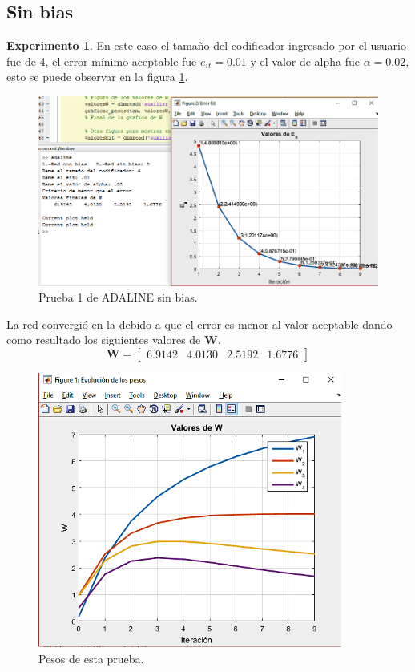 \documentclass[12pt, titlepage]{article}
\begin{document}
    \subsection{Sin bias}
    \textbf{Experimento 1}. En este caso el tamaño del codificador ingresado por el usuario fue de 4, el error mínimo aceptable fue $e_{it} = 0.01$ y el valor de alpha fue $\alpha=0.02$, esto se puede observar en la figura \ref{fig:adaline3error}.
    \begin{figure}[H]
        \begin{center}
            \includegraphics[width=16cm]{img/adaline3/error.png}
            \caption{Prueba 1 de ADALINE sin bias.}
            \label{fig:adaline3error}
        \end{center}
    \end{figure}
    La red convergió en la debido a que el error es menor al valor aceptable dando como resultado los siguientes valores de $\boldsymbol{W}$.
    \[ \boldsymbol{W} = \left[\begin{array}{cccc}6.9142 & 4.0130 & 2.5192 & 1.6776\end{array}\right] \]
    \begin{figure}[H]
        \begin{center}
            \includegraphics[width=10cm]{img/adaline3/pesosbias.png}
            \caption{Pesos de esta prueba.}
            \label{fig:adaline3pesos}
        \end{center}
    \end{figure}
\end{document}
